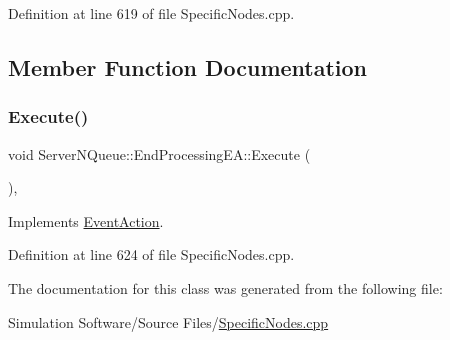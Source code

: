 Definition at line 619 of file Specific\+Nodes.\+cpp.



\subsection{Member Function Documentation}
\mbox{\label{class_server_n_queue_1_1_end_processing_e_a_a58033da71d12b3d61bf4c48f7c470e3d}} 
\subsubsection{\texorpdfstring{Execute()}{Execute()}}
{\footnotesize\ttfamily void Server\+N\+Queue\+::\+End\+Processing\+E\+A\+::\+Execute (\begin{DoxyParamCaption}{ }\end{DoxyParamCaption})\hspace{0.3cm}{\ttfamily [inline]}, {\ttfamily [virtual]}}



Implements \hyperlink{class_event_action_a62b9d07abb4ca8e7c078b076a1ab1a9f}{Event\+Action}.



Definition at line 624 of file Specific\+Nodes.\+cpp.



The documentation for this class was generated from the following file\+:\begin{DoxyCompactItemize}
\item 
Simulation Software/\+Source Files/\hyperlink{_specific_nodes_8cpp}{Specific\+Nodes.\+cpp}\end{DoxyCompactItemize}
